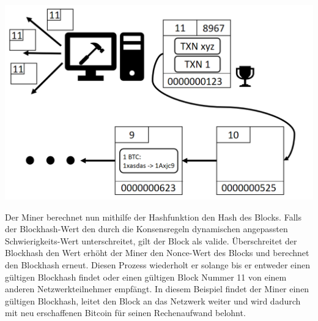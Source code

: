 \vspace{1cm}
\begin{minipage}{0.55\textwidth}
\includegraphics[width=\textwidth]{Figures/konzept_btc/konzept5}
\centering
\decoRule
{}
\label{fig:konzept5}
\end{minipage}
\begin{minipage}{0.45\textwidth}
Der Miner berechnet nun mithilfe der Hashfunktion den Hash des Blocks. Falls der Blockhash-Wert den durch die Konsensregeln dynamischen angepassten Schwierigkeits-Wert unterschreitet, gilt der Block als valide. Überschreitet der Blockhash den Wert erhöht der Miner den Nonce-Wert des Blocks und berechnet den Blockhash erneut. Diesen Prozess wiederholt er solange bis er entweder einen gültigen Blockhash findet oder einen gültigen Block Nummer 11 von einem anderen Netzwerkteilnehmer empfängt.
In diesem Beispiel findet der Miner einen gültigen Blockhash, leitet den Block an das Netzwerk weiter und wird dadurch mit neu erschaffenen Bitcoin für seinen Rechenaufwand belohnt.
\end{minipage}

